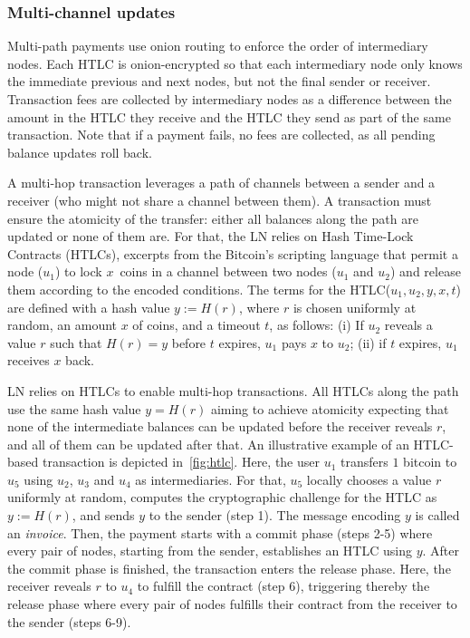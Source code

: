 \subsubsection*{Multi-channel updates}

Multi-path payments use onion routing to enforce the order of intermediary nodes.
Each HTLC is onion-encrypted so that each intermediary node only knows the immediate previous and next nodes, but not the final sender or receiver.
Transaction fees are collected by intermediary nodes as a difference between the amount in the HTLC they receive and the HTLC they send as part of the same transaction.
Note that if a payment fails, no fees are collected, as all pending balance updates roll back.

A multi-hop transaction leverages a path of channels between a sender and a receiver (who might not share a channel between them).
A transaction must ensure the atomicity of the transfer: either all balances along the path are updated or none of them are.
For that, the LN relies on Hash Time-Lock Contracts (HTLCs), 
excerpts from the Bitcoin's scripting language that 
permit a node ($u_1$) to lock $x$~coins in a channel between two nodes ($u_1$ and $u_2$) 
and release them according to the encoded conditions.
The terms for the HTLC($u_1, u_2, y, x, t$) are defined with a hash value $y := H(r)$, 
where $r$ is chosen uniformly at random, 
an amount $x$ of coins, and a timeout $t$, as follows: 
(i) If $u_2$ reveals a value $r$ such that $H(r) = y$ before $t$ expires, $u_1$ pays $x$ to $u_2$; 
(ii) if $t$ expires, $u_1$ receives $x$ back.

LN relies on HTLCs to enable multi-hop transactions. 
All HTLCs along the path use the same hash value $y=H(r)$ aiming to achieve atomicity expecting that 
none of the intermediate balances can be updated before the receiver reveals $r$, and all of them can be updated after that.
An illustrative example of an HTLC-based transaction is depicted in~\cref{fig:htlc}.
Here, the user $u_1$ transfers $1$ bitcoin to $u_5$ using $u_2$, $u_3$ and $u_4$ as intermediaries. 
For that, $u_5$ locally chooses a value $r$ 
uniformly at random, computes the cryptographic challenge for the HTLC as $y := H(r)$, 
and sends $y$ to the sender (step 1).
The message encoding $y$ is called an \textit{invoice}.
Then, the payment starts with a commit phase (steps 2-5) where every pair of nodes, 
starting from the sender, establishes an HTLC using $y$.
After the commit phase is finished, the transaction enters the release phase.
Here, the receiver reveals $r$ to $u_4$ to fulfill the contract (step 6), 
triggering thereby the release phase where every pair of nodes fulfills their 
contract from the receiver to the sender (steps 6-9).

